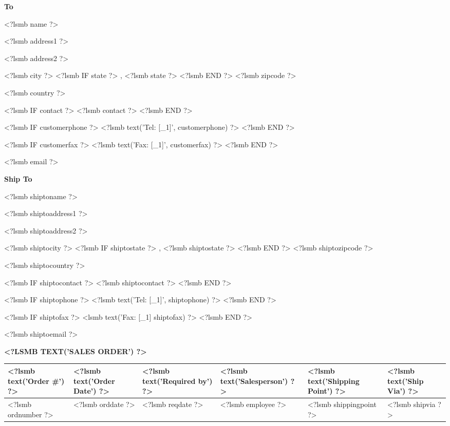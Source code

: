\documentclass{scrartcl}
\begin{document}
\parbox[t]{.5\textwidth}{
\textbf{To}
\vspace{0.3cm}
  
<?lsmb name ?>

<?lsmb address1 ?>

<?lsmb address2 ?>

<?lsmb city ?>
<?lsmb IF state ?>
\hspace{-0.1cm}, <?lsmb state ?>
<?lsmb END ?>
<?lsmb zipcode ?>

<?lsmb country ?>

\vspace{0.3cm}

<?lsmb IF contact ?>
<?lsmb contact ?>
\vspace{0.2cm}
<?lsmb END ?>

<?lsmb IF customerphone ?>
<?lsmb text('Tel: [_1]', customerphone) ?>
<?lsmb END ?>

<?lsmb IF customerfax ?>
<?lsmb text('Fax: [_1]', customerfax) ?>
<?lsmb END ?>

<?lsmb email ?>
}
\parbox[t]{.5\textwidth}{
\textbf{Ship To}
\vspace{0.3cm}

<?lsmb shiptoname ?>

<?lsmb shiptoaddress1 ?>

<?lsmb shiptoaddress2 ?>

<?lsmb shiptocity ?>
<?lsmb IF shiptostate ?>
\hspace{-0.1cm}, <?lsmb shiptostate ?>
<?lsmb END ?>
<?lsmb shiptozipcode ?>

<?lsmb shiptocountry ?>

\vspace{0.3cm}

<?lsmb IF shiptocontact ?>
<?lsmb shiptocontact ?>
\vspace{0.2cm}
<?lsmb END ?>

<?lsmb IF shiptophone ?>
<?lsmb text('Tel: [_1]', shiptophone) ?>
<?lsmb END ?>

<?lsmb IF shiptofax ?>
<lsmb text('Fax: [_1] shiptofax) ?>
<?lsmb END ?>

<?lsmb shiptoemail ?>
}
\hfill

\vspace{1cm}

\textbf{\MakeUppercase{<?lsmb text('Sales Order') ?>}}
\hfill

\vspace{1cm}

\begin{tabularx}{\textwidth}{*{6}{|X}|} \hline
  \textbf{<?lsmb text('Order #') ?>} & \textbf{<?lsmb text('Order Date') ?>} 
  & \textbf{<?lsmb text('Required by') ?>} 
  & \textbf{<?lsmb text('Salesperson') ?>} 
  & \textbf{<?lsmb text('Shipping Point') ?>} 
  & \textbf{<?lsmb text('Ship Via') ?>} \\ [0.5em]
  \hline
  <?lsmb ordnumber ?> & <?lsmb orddate ?> & <?lsmb reqdate ?> & <?lsmb employee ?> & <?lsmb shippingpoint ?> & <?lsmb shipvia ?> \\
  \hline
\end{tabularx}
  
\end{document}
